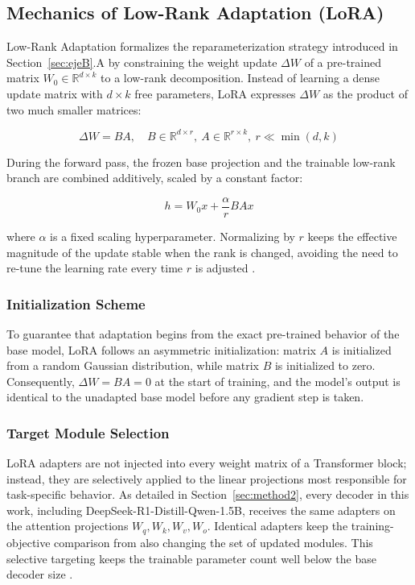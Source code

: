 \documentclass[conference]{IEEEtran}
\begin{document}
\subsection{Mechanics of Low-Rank Adaptation (LoRA)}

Low-Rank Adaptation formalizes the reparameterization strategy introduced in Section~\ref{sec:ejeB}.A by constraining the weight update $\Delta W$ of a pre-trained matrix $W_0 \in \mathbb{R}^{d \times k}$ to a low-rank decomposition. Instead of learning a dense update matrix with $d \times k$ free parameters, LoRA expresses $\Delta W$ as the product of two much smaller matrices:

\begin{equation}
    \Delta W = BA, \quad B \in \mathbb{R}^{d \times r},\ A \in \mathbb{R}^{r \times k},\ r \ll \min(d, k)
\end{equation}

During the forward pass, the frozen base projection and the trainable low-rank branch are combined additively, scaled by a constant factor:

\begin{equation}
    h = W_0 x + \frac{\alpha}{r} B A x
\end{equation}

\noindent where $\alpha$ is a fixed scaling hyperparameter. Normalizing by $r$ keeps the effective magnitude of the update stable when the rank is changed, avoiding the need to re-tune the learning rate every time $r$ is adjusted \cite{nwaiwu2025peft}.

\subsubsection{Initialization Scheme}
To guarantee that adaptation begins from the exact pre-trained behavior of the base model, LoRA follows an asymmetric initialization: matrix $A$ is initialized from a random Gaussian distribution, while matrix $B$ is initialized to zero. Consequently, $\Delta W = BA = 0$ at the start of training, and the model's output is identical to the unadapted base model before any gradient step is taken.

\subsubsection{Target Module Selection}
LoRA adapters are not injected into every weight matrix of a Transformer block; instead, they are selectively applied to the linear projections most responsible for task-specific behavior. As detailed in Section~\ref{sec:method2}, every decoder in this work, including DeepSeek-R1-Distill-Qwen-1.5B, receives the same adapters on the attention projections $W_q, W_k, W_v, W_o$. Identical adapters keep the training-objective comparison from also changing the set of updated modules. This selective targeting keeps the trainable parameter count well below the base decoder size \cite{nwaiwu2025peft, mohammed2026deepfake}.
\end{document}
